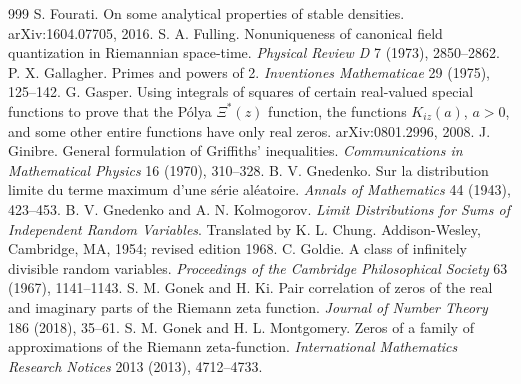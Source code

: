 \begin{thebibliography}{999}
 S. Fourati. On some analytical properties of stable densities. arXiv:1604.07705, 2016.
 S. A. Fulling. Nonuniqueness of canonical field quantization in Riemannian space-time. \emph{Physical Review D} 7 (1973), 2850--2862.
 P. X. Gallagher. Primes and powers of 2. \emph{Inventiones Mathematicae} 29 (1975), 125--142.
 G. Gasper. Using integrals of squares of certain real-valued special functions to prove that the P\'olya $\Xi^*(z)$ function, the functions $K_{iz}(a)$, $a>0$, and some other entire functions have only real zeros. arXiv:0801.2996, 2008.
 J. Ginibre. General formulation of Griffiths' inequalities. \emph{Communications in Mathematical Physics} 16 (1970), 310--328.
 B. V. Gnedenko. Sur la distribution limite du terme maximum d'une s\'erie al\'eatoire. \emph{Annals of Mathematics} 44 (1943), 423--453.
 B. V. Gnedenko and A. N. Kolmogorov. \emph{Limit Distributions for Sums of Independent Random Variables}. Translated by K. L. Chung. Addison-Wesley, Cambridge, MA, 1954; revised edition 1968.
 C. Goldie. A class of infinitely divisible random variables. \emph{Proceedings of the Cambridge Philosophical Society} 63 (1967), 1141--1143.
 S. M. Gonek and H. Ki. Pair correlation of zeros of the real and imaginary parts of the Riemann zeta function. \emph{Journal of Number Theory} 186 (2018), 35--61.
 S. M. Gonek and H. L. Montgomery. Zeros of a family of approximations of the Riemann zeta-function. \emph{International Mathematics Research Notices} 2013 (2013), 4712--4733.

\end{thebibliography}
